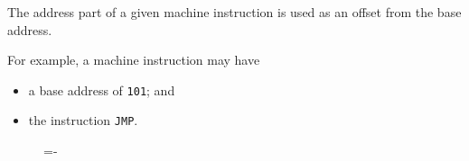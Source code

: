 \documentclass[a4paper]{systems-software}
\begin{document}
The address part of a given machine instruction is used as an offset from the base address.

For example, a machine instruction may have
\begin{itemize}
	\item a base address of \texttt{101}; and
	\item the instruction \texttt{JMP}.
\end{itemize}

\begin{figure}[H]
  \lineskip=-\fboxrule
\end{figure}
\end{document}
